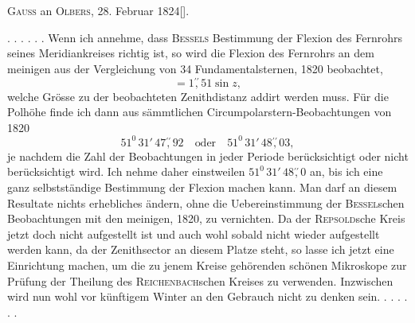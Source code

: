 \begin{center}\textsc{Gauss} an \textsc{Olbers}, 28. Februar 1824[\begingroup\renewcommand{\thefootnote}{*)}\footnotemark\renewcommand{\thefootnote}{[*)}\footnotetext{Vgl. Notiz 5, S. 348.]}\endgroup].\end{center}
\noindent\hspace*{\parindent}. . . . . . Wenn ich annehme, dass \textsc{Bessels} Bestimmung der Flexion des Fernrohrs seines Meridiankreises richtig ist, so wird die Flexion des Fernrohrs an dem meinigen aus der Vergleichung von 34 Fundamentalsternen, 1820 beobachtet,
\[
=1\overset{\prime\prime}{,}51\sin z,
\]
\noindent welche Grösse zu der beobachteten Zenithdistanz addirt werden muss. Für die Polhöhe finde ich dann aus sämmtlichen Circumpolarstern-Beobachtungen von 1820
\[
51^0\,31'\,47\overset{\prime\prime}{,}92\quad\text{oder}\quad51^0\,31'\,48\overset{\prime\prime}{,}03,
\]
\noindent je nachdem die Zahl der Beobachtungen in jeder Periode berücksichtigt oder nicht berücksichtigt wird. Ich nehme daher einstweilen \(51^0\,31'\,48\overset{\prime\prime}{,}0\) an, bis ich eine ganz selbstständige Bestimmung der Flexion machen kann. Man darf an diesem Resultate nichts erhebliches ändern, ohne die Uebereinstimmung der \textsc{Bessel}schen Beobachtungen mit den meinigen, 1820, zu vernichten. Da der \textsc{Repsold}sche Kreis jetzt doch nicht aufgestellt ist und auch wohl sobald nicht wieder aufgestellt werden kann, da der Zenithsector an diesem Platze steht, so lasse ich jetzt eine Einrichtung machen, um die zu jenem Kreise gehörenden schönen Mikroskope zur Prüfung der Theilung des \textsc{Reichenbach}schen Kreises zu verwenden. Inzwischen wird nun wohl vor künftigem Winter an den Gebrauch nicht zu denken sein. . . . . . .
\clearpage\endgroup
